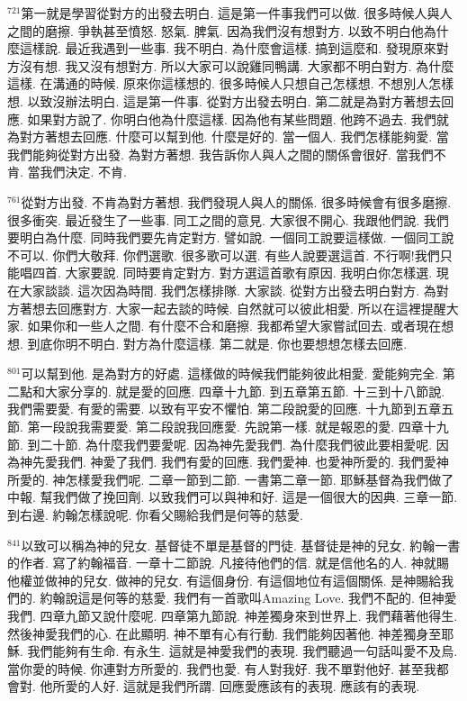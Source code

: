 \documentclass{book}
\begin{document}
$^{721}$第一就是學習從對方的出發去明白.
這是第一件事我們可以做.
很多時候人與人之間的磨擦.
爭執甚至憤怒.
怒氣.
脾氣.
因為我們沒有想對方.
以致不明白他為什麼這樣說.
最近我遇到一些事.
我不明白.
為什麼會這樣.
搞到這麼和.
發現原來對方沒有想.
我又沒有想對方.
所以大家可以說雞同鴨講.
大家都不明白對方.
為什麼這樣.
在溝通的時候.
原來你這樣想的.
很多時候人只想自己怎樣想.
不想別人怎樣想.
以致沒辦法明白.
這是第一件事.
從對方出發去明白.
第二就是為對方著想去回應.
如果對方說了.
你明白他為什麼這樣.
因為他有某些問題.
他跨不過去.
我們就為對方著想去回應.
什麼可以幫到他.
什麼是好的.
當一個人.
我們怎樣能夠愛.
當我們能夠從對方出發.
為對方著想.
我告訴你人與人之間的關係會很好.
當我們不肯.
當我們決定.
不肯.

$^{761}$從對方出發.
不肯為對方著想.
我們發現人與人的關係.
很多時候會有很多磨擦.
很多衝突.
最近發生了一些事.
同工之間的意見.
大家很不開心.
我跟他們說.
我們要明白為什麼.
同時我們要先肯定對方.
譬如說.
一個同工說要這樣做.
一個同工說不可以.
你們大敬拜.
你們選歌.
很多歌可以選.
有些人說要選這首.
不行啊!我們只能唱四首.
大家要說.
同時要肯定對方.
對方選這首歌有原因.
我明白你怎樣選.
現在大家談談.
這次因為時間.
我們怎樣排隊.
大家談.
從對方出發去明白對方.
為對方著想去回應對方.
大家一起去談的時候.
自然就可以彼此相愛.
所以在這裡提醒大家.
如果你和一些人之間.
有什麼不合和磨擦.
我都希望大家嘗試回去.
或者現在想想.
到底你明不明白.
對方為什麼這樣.
第二就是.
你也要想想怎樣去回應.

$^{801}$可以幫到他.
是為對方的好處.
這樣做的時候我們能夠彼此相愛.
愛能夠完全.
第二點和大家分享的.
就是愛的回應.
四章十九節.
到五章第五節.
十三到十八節說.
我們需要愛.
有愛的需要.
以致有平安不懼怕.
第二段說愛的回應.
十九節到五章五節.
第一段說我需要愛.
第二段說我回應愛.
先說第一樣.
就是報恩的愛.
四章十九節.
到二十節.
為什麼我們要愛呢.
因為神先愛我們.
為什麼我們彼此要相愛呢.
因為神先愛我們.
神愛了我們.
我們有愛的回應.
我們愛神.
也愛神所愛的.
我們愛神所愛的.
神怎樣愛我們呢.
二章一節到二節.
一書第二章一節.
耶穌基督為我們做了中報.
幫我們做了挽回劑.
以致我們可以與神和好.
這是一個很大的因典.
三章一節.
到右邊.
約翰怎樣說呢.
你看父賜給我們是何等的慈愛.

$^{841}$以致可以稱為神的兒女.
基督徒不單是基督的門徒.
基督徒是神的兒女.
約翰一書的作者.
寫了約翰福音.
一章十二節說.
凡接待他們的信.
就是信他名的人.
神就賜他權並做神的兒女.
做神的兒女.
有這個身份.
有這個地位有這個關係.
是神賜給我們的.
約翰說這是何等的慈愛.
我們有一首歌叫Amazing Love.
我們不配的.
但神愛我們.
四章九節又說什麼呢.
四章第九節說.
神差獨身來到世界上.
我們藉著他得生.
然後神愛我們的心.
在此顯明.
神不單有心有行動.
我們能夠因著他.
神差獨身至耶穌.
我們能夠有生命.
有永生.
這就是神愛我們的表現.
我們聽過一句話叫愛不及烏.
當你愛的時候.
你連對方所愛的.
我們也愛.
有人對我好.
我不單對他好.
甚至我都會對.
他所愛的人好.
這就是我們所謂.
回應愛應該有的表現.
應該有的表現.
\end{document}
